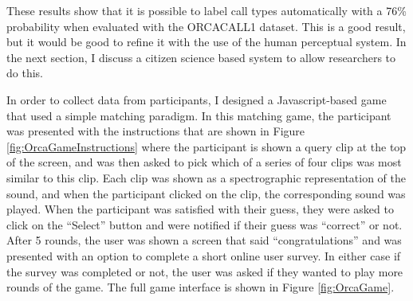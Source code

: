 \documentclass[12pt,oneside]{book}
\begin{document}
These results show that it is possible to label call types automatically
with a 76\% probability when evaluated with the ORCACALL1 dataset.
This is a good result, but it would be good to refine it with the use
of the human perceptual system.  In the next section, I discuss a
citizen science based system to allow researchers to do this.


\label{chap:citizenscienceevaluation}

In order to collect data from participants, I designed a
Javascript-based game that used a simple matching paradigm. In this
matching game, the participant was presented with the instructions
that are shown in Figure \ref{fig:OrcaGameInstructions} where the
participant is shown a query clip at the top of the screen, and was
then asked to pick which of a series of four clips was most similar to
this clip.  Each clip was shown as a spectrographic representation of
the sound, and when the participant clicked on the clip, the
corresponding sound was played.  When the participant was satisfied
with their guess, they were asked to click on the ``Select'' button
and were notified if their guess was ``correct'' or not.  After 5
rounds, the user was shown a screen that said ``congratulations'' and
was presented with an option to complete a short online user survey.
In either case if the survey was completed or not, the user was asked
if they wanted to play more rounds of the game.  The full game
interface is shown in Figure \ref{fig:OrcaGame}.
\end{document}
